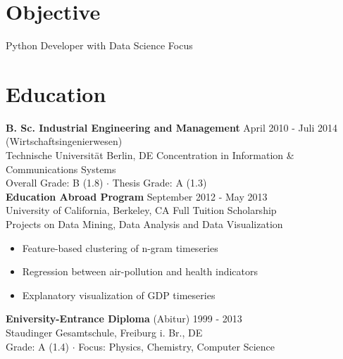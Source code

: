 \documentclass[margin]{res}
\begin{document}
 
 
 
\address{ \\ Rollbergstr. 1 \\ 12053 Berlin, DE  \\ $\star$21.06.1989
        }
\address{ \\ +49 175 768 49 37 \\ alec@hanefeld.eu \\ github.com/ahane \\}

 
\begin{resume} 
 
\section{Objective} 
Python Developer with Data Science Focus

\section{Education} 
{\bf B. Sc. Industrial Engineering and Management} \hfill April 2010 - Juli 2014 \\
(Wirtschaftsingenierwesen) \\
Technische Universit{\"a}t Berlin, DE 
Concentration in Information \& Communications Systems\\
Overall Grade: B (1.8) $\cdot$ Thesis Grade: A (1.3)\\

{\bf Education Abroad Program} \hfill September 2012 - May 2013 \\
University of California, Berkeley, CA 
Full Tuition Scholarship\\
Projects on Data Mining, Data Analysis and Data Visualization
\begin{itemize} \itemsep -2pt  %
\item Feature-based clustering of n-gram timeseries
\item Regression between air-pollution and health indicators
\item Explanatory visualization of GDP timeseries
 \end{itemize}

{\bf Eniversity-Entrance Diploma} (Abitur)
\hfill 1999 - 2013 \\
Staudinger Gesamtschule, Freiburg i. Br., DE  \\
Grade: A (1.4) $\cdot$ Focus: Physics, Chemistry, Computer Science


\end{resume}
\end{document}
